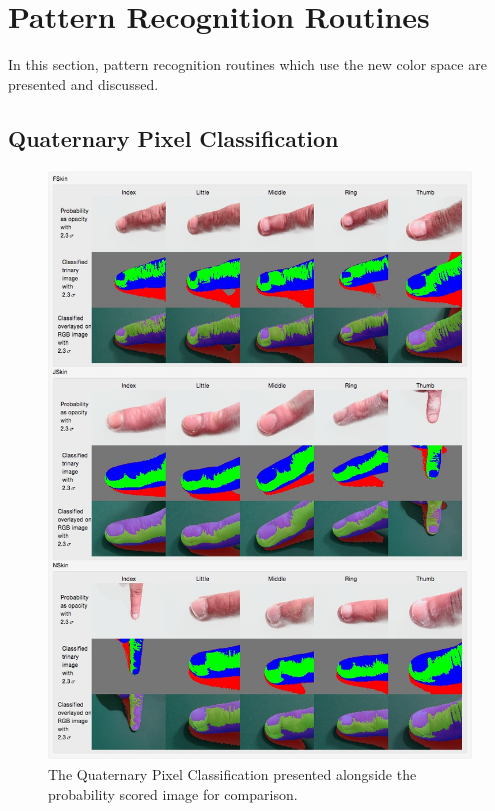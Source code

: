 \section{Pattern Recognition Routines}\label{sec:PatternRecognitionRoutines}
In this section, pattern recognition routines which use the new color space are presented and discussed.

\subsection{Quaternary Pixel Classification}\label{sec:QuaternaryPixelClassification}

\newcommand{\WoBoBool}{\underset{\scalebox{0.5}{WoBo}}{\mathbb{L}}}
\newcommand{\ColorSquareBool}{\underset{ \scalebox{0.5}[0.5]{square} }{ \mathbb{C} } }
\newcommand{\ColorEllipseBool}{\underset{ \scalebox{0.5}[0.5]{ellipse} }{ \mathbb{C} } }

\begin{figure}[h!]
  \centering
    \includegraphics[width=1.0\textwidth]{Chapter4/Figs/ClassifiedSkin.jpg}
    \caption{The Quaternary Pixel Classification presented alongside the probability scored image for comparison.}\label{fig:2BitImage}
\end{figure}

